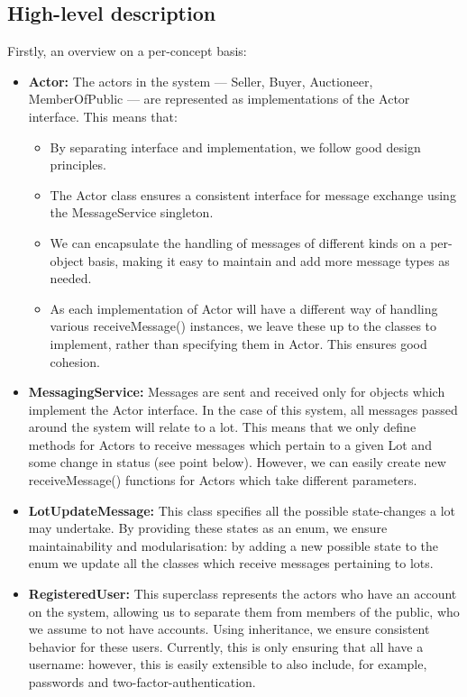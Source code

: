 \documentclass[titlepage, 12pt]{extarticle}
\begin{document}
\subsection{High-level description}
\noindent Firstly, an overview on a per-concept basis:
\begin{itemize}
\item {\bf Actor: } The actors in the system --- Seller, Buyer, Auctioneer, MemberOfPublic --- are represented as implementations of the Actor interface. This means that:
  \begin{itemize}
  \item By separating interface and implementation, we follow good design principles.
  \item The Actor class ensures a consistent interface for message exchange using the MessageService singleton.
  \item We can encapsulate the handling of messages of different kinds on a per-object basis, making it easy to maintain and add more message types as needed.
  \item As each implementation of Actor will have a different way of handling various receiveMessage() instances, we leave these up to the classes to implement, rather than specifying them in Actor. This ensures good cohesion. 
  \end{itemize}
\item {\bf MessagingService: } Messages are sent and received only for objects which implement the Actor interface. In the case of this system, all messages passed around the system will relate to a lot. This means that we only define methods for Actors to receive messages which pertain to a given Lot and some change in status (see point below). However, we can easily create new receiveMessage() functions for Actors which take different parameters. 
\item {\bf LotUpdateMessage: } This class specifies all the possible state-changes a lot may undertake. By providing these states as an enum, we ensure maintainability and modularisation: by adding a new possible state to the enum we update all the classes which receive messages pertaining to lots.
\item {\bf RegisteredUser: } This superclass represents the actors who have an account on the system, allowing us to separate them from members of the public, who we assume to not have accounts. Using inheritance, we ensure consistent behavior for these users. Currently, this is only ensuring that all have a username: however, this is easily extensible to also include, for example, passwords and two-factor-authentication.

\end{itemize}
\end{document}
